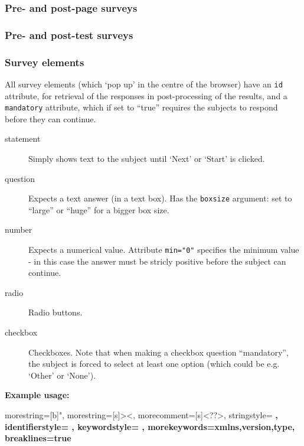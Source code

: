 \documentclass[11pt, oneside]{article}   	%
\begin{document}
		\subsubsection{Pre- and post-page surveys}

		\subsubsection{Pre- and post-test surveys}

		\subsubsection{Survey elements}
			All survey elements (which `pop up' in the centre of the browser) have an \texttt{id} attribute, for retrieval of the responses in post-processing of the results, and a \texttt{mandatory} attribute, which if set to ``true'' requires the subjects to respond before they can continue. 

			\begin{description}
				\item[statement] Simply shows text to the subject until `Next' or `Start' is clicked. 
				\item[question] Expects a text answer (in a text box). Has the \texttt{boxsize} argument: set to ``large'' or ``huge'' for a bigger box size.
				\item[number] Expects a numerical value. Attribute \texttt{min="0"} specifies the minimum value - in this case the answer must be stricly positive before the subject can continue. 
				\item[radio] Radio buttons. 
				\item[checkbox] Checkboxes. Note that when making a checkbox question ``mandatory'', the subject is forced to select at least one option (which could be e.g. `Other' or `None').\\
			\end{description}

			\textbf{Example usage:}\\


			{
			  morestring=[b]",
			  morestring=[s]{>}{<},
			  morecomment=[s]{<?}{?>},
			  stringstyle=\color{black} \bfseries,
			  identifierstyle=\color{darkblue} \bfseries,
			  keywordstyle=\color{cyan} \bfseries,
			  morekeywords={xmlns,version,type}, 
			  breaklines=true%
			}
			\scriptsize
			\lstset{language=XML}
\end{document}
